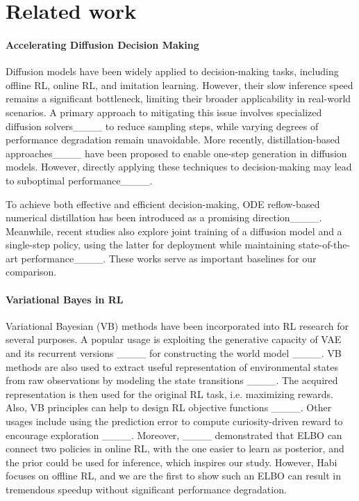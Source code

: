 \section{Related work}
\paragraph{Accelerating Diffusion Decision Making}
Diffusion models have been widely applied to decision-making tasks, including offline RL, online RL, and imitation learning. However, their slow inference speed remains a significant bottleneck, limiting their broader applicability in real-world scenarios. A primary approach to mitigating this issue involves specialized diffusion solvers____ to reduce sampling steps, while varying degrees of performance degradation remain unavoidable. More recently, distillation-based approaches____ have been proposed to enable one-step generation in diffusion models. However, directly applying these techniques to decision-making may lead to suboptimal performance____.

To achieve both effective and efficient decision-making, ODE reflow-based numerical distillation has been introduced as a promising direction____. Meanwhile, recent studies also explore joint training of a diffusion model and a single-step policy, using the latter for deployment while maintaining state-of-the-art performance____. These works serve as important baselines for our comparison.

\paragraph{Variational Bayes in RL}
Variational Bayesian (VB) methods have been incorporated into RL research for several purposes. A popular usage is exploiting the generative capacity of VAE and its recurrent versions ____ for constructing the world model ____. VB methods are also used to extract useful representation of environmental states from raw observations by modeling the state transitions ____. The acquired representation is then used for the original RL task, i.e. maximizing rewards. Also, VB principles can help to design RL objective functions ____. Other usages include using the prediction error to compute curiosity-driven reward to encourage exploration ____. Moreover,  ____ demonstrated that ELBO can connect two policies in online RL, with the one easier to learn as posterior, and the prior could be used for inference, which inspires our study. However, Habi focuses on offline RL, and we are the first to show such an ELBO can result in tremendous speedup without significant performance degradation.
